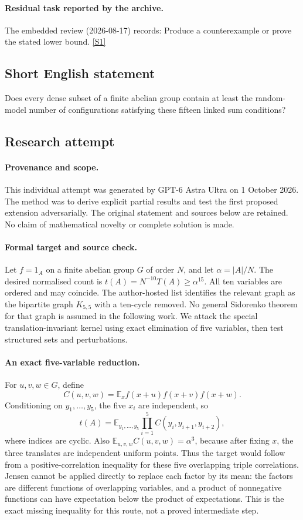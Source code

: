 \documentclass[11pt,a4paper]{article}
\newcommand{\E}{\mathbb{E}}
\newcommand{\sref}[2]{\hyperlink{source:#1:#2}{[S#2]}}
\begin{document}
\paragraph{Residual task reported by the archive.}

The embedded review (2026-08-17) records: Produce a counterexample or prove the stated lower bound. \sref{102}{1}

\subsection{Short English statement}

Does every dense subset of a finite abelian group contain at least the random-model number of configurations satisfying these fifteen linked sum conditions?

\subsection{Research attempt}

\paragraph{Provenance and scope.}
This individual attempt was generated by GPT-6 Astra Ultra on 1 October 2026. The method was to derive explicit partial results and test the first proposed extension adversarially. The original statement and sources below are retained. No claim of mathematical novelty or complete solution is made.

\paragraph{Formal target and source check.}
Let $f=1_A$ on a finite abelian group $G$ of order $N$, and let $\alpha=|A|/N$. The desired normalised count is $t(A)=N^{-10}T(A)\geq\alpha^{15}$. All ten variables are ordered and may coincide. The author-hosted list identifies the relevant graph as the bipartite graph $K_{5,5}$ with a ten-cycle removed. No general Sidorenko theorem for that graph is assumed in the following work. We attack the special translation-invariant kernel using exact elimination of five variables, then test structured sets and perturbations.

\paragraph{An exact five-variable reduction.}
For $u,v,w\in G$, define
\[
 C(u,v,w)=\E_x f(x+u)f(x+v)f(x+w).
\]
Conditioning on $y_1,\ldots,y_5$, the five $x_i$ are independent, so
\[
 t(A)=\E_{y_1,\ldots,y_5}\prod_{i=1}^5
 C(y_i,y_{i+1},y_{i+2}),
\]
where indices are cyclic. Also $\E_{u,v,w}C(u,v,w)=\alpha^3$, because after fixing $x$, the three translates are independent uniform points. Thus the target would follow from a positive-correlation inequality for these five overlapping triple correlations. Jensen cannot be applied directly to replace each factor by its mean: the factors are different functions of overlapping variables, and a product of nonnegative functions can have expectation below the product of expectations. This is the exact missing inequality for this route, not a proved intermediate step.
\end{document}
